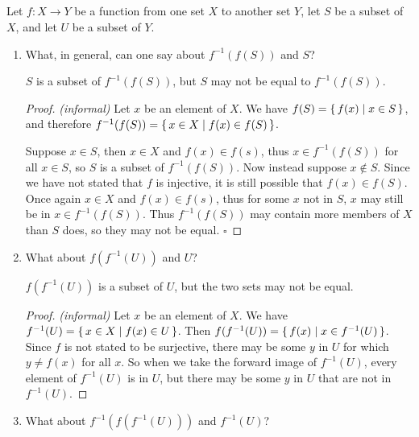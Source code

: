 \documentclass[../../main.tex]{subfiles}
\begin{document}
\subsection{}
\begin{q}
    Let $f \colon X \to Y$ be a function from one set $X$ to another set $Y$, let $S$ be a subset of $X$, and let $U$ be a subset of $Y$.
\end{q}

\begin{enumerate}
    \item
        \begin{q}
            What, in general, can one say about $f^{-1}(f(S))$ and $S$?
        \end{q}
        
        \begin{ans}
            $S$ is a subset of $f^{-1}(f(S))$, but $S$ may not be equal to $f^{-1}(f(S))$.
        \end{ans}
        \begin{proof}
            \emph{(informal)} 
            Let $x$ be an element of $X$. 
            We have $f(S) = \{\,f(x)\mid x \in S\,\}$, and therefore $f^{-1}(f(S)) = \{\,x \in X\mid f(x) \in f(S)\,\}$.

            Suppose $x \in S$, then $x \in X$ and $f(x) \in f(s)$, thus $x \in f^{-1}(f(S))$ for all $x \in S$, so $S$ is a subset of $f^{-1}(f(S))$. Now instead suppose $x \notin S$. Since we have not stated that $f$ is injective, it is still possible that $f(x) \in f(S)$. Once again $x \in X$ and $f(x) \in f(s)$, thus for some $x$ not in $S$, $x$ may still be in $x \in f^{-1}(f(S))$.
            Thus $f^{-1}(f(S))$ may contain more members of $X$ than $S$ does, so they may not be equal.
            $\square$
        \end{proof}
    \item
        \begin{q}
            What about $f(f^{-1}(U))$ and $U$?
        \end{q}
        
        \begin{ans}
            $f(f^{-1}(U))$ is a subset of $U$, but the two sets may not be equal.
        \end{ans}
            
        \begin{proof}
                \emph{(informal)}
                Let $x$ be an element of $X$. 
                We have $f^{-1}(U)=\{\,x \in X\mid f(x) \in U\,\}$. 
                Then $f(f^{-1}(U))=\{\,f(x)\mid x \in f^{-1}(U)\,\}$.
                Since $f$ is not stated to be surjective, there may be some $y$ in $U$ for which $y \neq f(x)$ for all $x$.
                So when we take the forward image of $f^{-1}(U)$, every element of $f^{-1}(U)$ is in $U$, but there may be some $y$ in $U$ that are not in $f^{-1}(U)$.
        \end{proof}
    \item 
        \begin{q}
            What about $f^{-1}(f(f^{-1}(U)))$ and $f^{-1}(U)$? 
        \end{q}
        

\end{enumerate}
\end{document}
